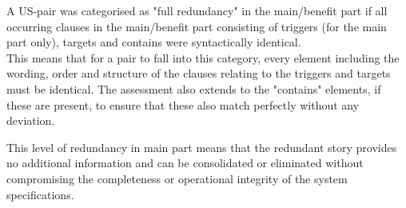 \begin{definition}
	A US-pair was categorised as "full redundancy" in the main/benefit part if all occurring clauses in the main/benefit part consisting of triggers (for the main part only), targets and contains were syntactically identical.\\
	This means that for a pair to fall into this category, every element including the wording, order and structure of the clauses relating to the triggers and targets must be identical. The assessment also extends to the "contains" elements, if these are present, to ensure that these also match perfectly without any deviation.\\
\end{definition}
This level of redundancy in main part means that the redundant story provides no additional information and can be consolidated or eliminated without compromising the completeness or operational integrity of the system specifications.

